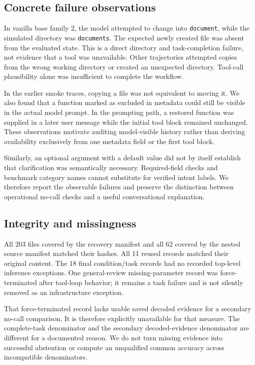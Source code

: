 \documentclass[conference]{IEEEtran}
\newcommand{\code}[1]{\texttt{#1}}
\begin{document}
\subsection{Concrete failure observations}
In vanilla base family 2, the model attempted to change into \code{document}, while the simulated directory was \code{documents}. The expected newly created file was absent from the evaluated state. This is a direct directory and task-completion failure, not evidence that a tool was unavailable. Other trajectories attempted copies from the wrong working directory or created an unexpected directory. Tool-call plausibility alone was insufficient to complete the workflow.

In the earlier smoke traces, copying a file was not equivalent to moving it. We also found that a function marked as excluded in metadata could still be visible in the actual model prompt. In the prompting path, a restored function was supplied in a later user message while the initial tool block remained unchanged. These observations motivate auditing model-visible history rather than deriving availability exclusively from one metadata field or the first tool block.

Similarly, an optional argument with a default value did not by itself establish that clarification was semantically necessary. Required-field checks and benchmark category names cannot substitute for verified intent labels. We therefore report the observable failures and preserve the distinction between operational no-call checks and a useful conversational explanation.

\subsection{Integrity and missingness}
All 203 files covered by the recovery manifest and all 62 covered by the nested source manifest matched their hashes. All 11 reused records matched their original content. The 18 final condition/task records had no recorded top-level inference exceptions. One general-review missing-parameter record was force-terminated after tool-loop behavior; it remains a task failure and is not silently removed as an infrastructure exception.

That force-terminated record lacks usable saved decoded evidence for a secondary no-call comparison. It is therefore explicitly unavailable for that measure. The complete-task denominator and the secondary decoded-evidence denominator are different for a documented reason. We do not turn missing evidence into successful abstention or compute an unqualified common accuracy across incompatible denominators.
\end{document}
